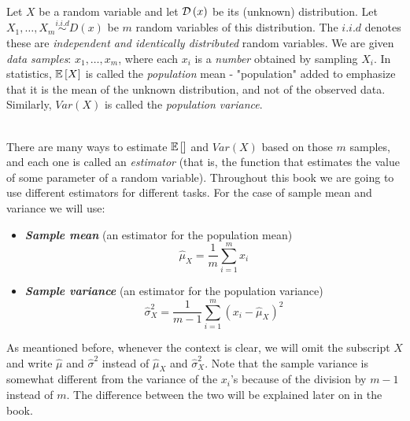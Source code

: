 ~\\Let $X$ be a random variable and let $\mathcal{D} \left(x\right)$ be its (unknown) distribution. Let $X_1,\ldots,X_m\overset{i.i.d}{\sim} D(x)$ be $m$ random variables of this distribution. The $i.i.d$ denotes these are \emph{independent and identically distributed} random variables. We are given \emph{data samples}: $x_1,\ldots,x_m$, where each $x_i$ is a {\em number} obtained by sampling $X_i$. In statistics, $\mathbb{E}\left[X\right]$ is called the {\em population} mean - "population" added to emphasize that it is the mean of the unknown distribution, and not of the observed data. Similarly, $Var\left(X\right)$ is called the \textit{population variance}.

~\\There are many ways to estimate $\mathbb{E}\left[\right]$ and $Var\left(X\right)$ based on those $m$ samples, and each one is called an \textit{estimator} (that is, the function that estimates the value of some parameter of a random variable). Throughout this book we are going to use different estimators for different tasks. For the case of sample mean and variance we will use:
\begin{itemize}
	\item \textbf{\textit{Sample mean}} (an estimator for the population mean) $$ \widehat{\mu}_X = \frac{1}{m} \sum_{i=1}^m x_i$$
	\item \textbf{\textit{Sample variance}} (an estimator for the population variance)$$\widehat{\sigma}_X^2 = \frac{1}{m-1} \sum_{i=1}^m (x_i-\widehat{\mu}_X)^2$$
\end{itemize}

As meantioned before, whenever the context is clear, we will omit the subscript $X$ and write $\widehat{\mu}$ and $\widehat{\sigma}^2$ instead of $\widehat{\mu}_X$ and $\widehat{\sigma}_X^2$. Note that the sample variance is somewhat different from the variance of the $x_i$'s because of the division by $m-1$ instead of $m$. The difference between the two will be explained later on in the book.

